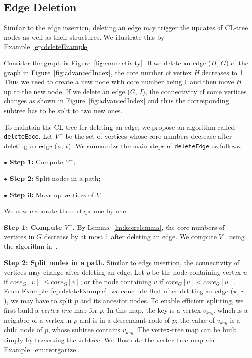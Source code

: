 \subsection{Edge Deletion}
\label{sec:edgeDeletion}

Similar to the edge insertion, deleting an edge may trigger the updates of CL-tree nodes as well as their structures. We illustrate this by Example~\ref{ep:deleteExample}.

\begin{example}
\label{ep:deleteExample}
Consider the graph in Figure~\ref{fig:connectivity}. If we delete an edge ($H$, $G$) of the graph in Figure~\ref{fig:advancedIndex}, the core number of vertex $H$ decreases to 1. Thus we need to create a new node with core number being 1 and then move $H$ up to the new node. If we delete an edge ($G$, $I$), the connectivity of some vertices changes as shown in Figure~\ref{fig:advancedIndex} and thus the corresponding subtree has to be split to two new ones.
\end{example}
To maintain the CL-tree for deleting an edge, we propose an algorithm called {\tt deleteEdge}.
Let $V^-$ be the set of vertices whose core numbers decrease after deleting an edge ($u$, $v$).
We summarize the main steps of {\tt deleteEdge} as follows.

$\bullet$ \textbf{Step 1:} Compute $V^-$;

$\bullet$ \textbf{Step 2:} Split nodes in a path;

$\bullet$ \textbf{Step 3:} Move up vertices of $V^-$.

We now elaborate these steps one by one.

\textbf{Step 1: Compute $V^-$.}
By Lemma~\ref{lm:kcorelemma}, the core numbers of vertices in $G$ decrease by at most 1 after deleting an edge.
We compute $V^-$ using the algorithm in~\cite{kcoreUpdate}.

\textbf{Step 2: Split nodes in a path.}
Similar to edge insertion, the connectivity of vertices may change after deleting an edge.
Let $p$ be the node containing vertex $u$ if $core_G[u]$ $\le$$core_G[v]$;
or the node containing $v$ if $core_G[v]$$<$$core_G[u]$.
From Example~\ref{ep:deleteExample}, we conclude that after deleting an edge ($u$, $v$),
we may have to split $p$ and its ancestor nodes.
To enable efficient splitting, we first build a \emph{vertex-tree} map for $p$.
In this map, the key is a vertex $v_{key}$,
which is a neighbor of a vertex in $p$ and is in a descendant node of $p$;
the value of $v_{key}$ is a child node of $p$, whose subtree contains $v_{key}$.
The vertex-tree map can be built simply by traversing the subtree.
We illustrate the vertex-tree map via Example~\ref{em:reorganize}.


